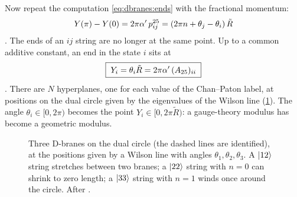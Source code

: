 Now repeat the computation \eqref{eq:dbranes:ends} with the fractional momentum:
\begin{equation}\label{eq:dbranes:sep}
 Y(\pi)-Y(0)=2\pi\alpha'\,p^{25}_{ij}=(2\pi n+\theta_j-\theta_i)\,\tilde R
\end{equation}
. The ends of an $ij$ string are no longer at the same
point. Up to a common additive constant, an end in the state $i$ sits at
\begin{equation}\label{eq:dbranes:position}
 \boxed{\;Y_i=\theta_i\tilde R=2\pi\alpha'\,(A_{25})_{ii}\;}
\end{equation}
. There are $N$ hyperplanes, one for each value of the
Chan--Paton label, at positions on the dual circle given by the eigenvalues of the Wilson line
(\cref{fig:dbranes:wilson}). The angle $\theta_i\in[0,2\pi)$ becomes the point
$Y_i\in[0,2\pi\tilde R)$: a gauge-theory modulus has become a geometric modulus.

\begin{figure}[ht]
\centering
{}
\caption{Three D-branes on the dual circle (the dashed lines are identified), at the positions
given by a Wilson line with angles $\theta_1,\theta_2,\theta_3$. A $|12\rangle$ string stretches
between two branes; a $|22\rangle$ string with $n=0$ can shrink to zero length; a $|33\rangle$ string
with $n=1$ winds once around the circle. After .}\label{fig:dbranes:wilson}
\end{figure}

